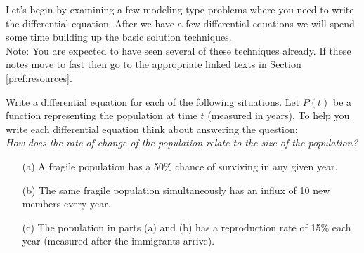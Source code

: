 Let's begin by examining a few modeling-type problems where you need to write the
differential equation.  After we have a few differential equations we will spend some time
building up the basic solution techniques. \\
Note: You are expected to have seen several of these techniques already.  If these notes
move to fast then go to the appropriate linked texts in Section \ref{pref:resources}.

\begin{problem}%
    Write a differential equation for each of the following situations.  Let $P(t)$ be a
    function representing the population at time $t$ (measured in years).  To help you write each differential equation think
    about answering the question: \\
    {\it How does the rate of change of the population relate to the size of the population?}
    \begin{enumerate}
        \item[(a)] A fragile population has a 50\% chance of surviving in any given year.  
        \item[(b)] The same fragile population simultaneously has an influx of 10 new
            members every year.
        \item[(c)] The population in parts (a) and (b) has a reproduction rate of 15\%
            each year (measured after the immigrants arrive).
    \end{enumerate}
\end{problem}

